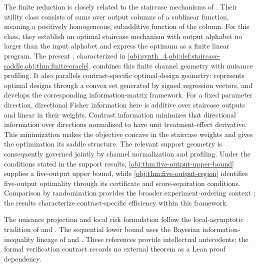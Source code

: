 The finite reduction is closely related to the staircase mechanisms of \citet[Theorems 2 and 4]{KairouzOhViswanath2016}. Their utility class consists of sums over output columns of a sublinear function, meaning a positively homogeneous, subadditive function of the column. For this class, they establish an optimal staircase mechanism with output alphabet no larger than the input alphabet and express the optimum as a finite linear program. %
The present , characterized in \cref{obj:synth_4,obj:def:staircase-saddle,obj:thm:finite-oracle}, combines this finite channel geometry with nuisance profiling. It also parallels contrast-specific optimal-design geometry: \citet[Sections 2--4]{Elfving1952} represents optimal designs through a convex set generated by signed regression vectors, and \citet[Chapter 2]{Pukelsheim2006} develops the corresponding information-matrix framework. For a fixed parameter direction, directional Fisher information here is additive over staircase outputs and linear in their weights. Contrast information minimizes that directional information over directions normalized to have unit treatment-effect derivative. This minimization makes the objective concave in the staircase weights and gives the optimization its saddle structure. The relevant support geometry is consequently governed jointly by channel normalization and profiling. Under the conditions stated in the support results, \cref{obj:thm:five-output-upper-bound} supplies a five-output upper bound, while \cref{obj:thm:five-output-region} identifies five-output optimality through its certificate and score-separation conditions. Comparison by randomization provides the broader experiment-ordering context \citep[pp. 265--272]{Blackwell1953}; the results characterize contrast-specific efficiency within this framework.

The nuisance projection and local risk formulation follow the local-asymptotic tradition of \citet[Chapter 6]{LeCam2000} and \citet[Chapters 7--8 and 25]{VanDerVaart1998}. The sequential lower bound uses the Bayesian information-inequality lineage of \citet{VanTrees2001} and \citet[pp. 59--79]{Gill1995}. These references provide intellectual antecedents; the formal verification contract records no external theorem as a Lean proof dependency.

